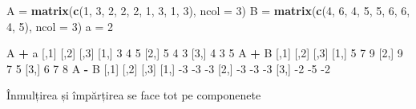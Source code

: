 \documentclass[]{article}
\newenvironment{Shaded}{\begin{snugshade}}{\end{snugshade}}
\newcommand{\DataTypeTok}[1]{\textcolor[rgb]{0.13,0.29,0.53}{#1}}
\newcommand{\DecValTok}[1]{\textcolor[rgb]{0.00,0.00,0.81}{#1}}
\newcommand{\KeywordTok}[1]{\textcolor[rgb]{0.13,0.29,0.53}{\textbf{#1}}}
\newcommand{\NormalTok}[1]{#1}
\newcommand{\OperatorTok}[1]{\textcolor[rgb]{0.81,0.36,0.00}{\textbf{#1}}}
\newcommand{\StringTok}[1]{\textcolor[rgb]{0.31,0.60,0.02}{#1}}
\begin{document}
\begin{Shaded}
\begin{Highlighting}[]
\NormalTok{A =}\StringTok{ }\KeywordTok{matrix}\NormalTok{(}\KeywordTok{c}\NormalTok{(}\DecValTok{1}\NormalTok{, }\DecValTok{3}\NormalTok{, }\DecValTok{2}\NormalTok{, }\DecValTok{2}\NormalTok{, }\DecValTok{2}\NormalTok{, }\DecValTok{1}\NormalTok{, }\DecValTok{3}\NormalTok{, }\DecValTok{1}\NormalTok{, }\DecValTok{3}\NormalTok{), }\DataTypeTok{ncol =} \DecValTok{3}\NormalTok{)}
\NormalTok{B =}\StringTok{ }\KeywordTok{matrix}\NormalTok{(}\KeywordTok{c}\NormalTok{(}\DecValTok{4}\NormalTok{, }\DecValTok{6}\NormalTok{, }\DecValTok{4}\NormalTok{, }\DecValTok{5}\NormalTok{, }\DecValTok{5}\NormalTok{, }\DecValTok{6}\NormalTok{, }\DecValTok{6}\NormalTok{, }\DecValTok{4}\NormalTok{, }\DecValTok{5}\NormalTok{), }\DataTypeTok{ncol =} \DecValTok{3}\NormalTok{)}
\NormalTok{a =}\StringTok{ }\DecValTok{2}

\NormalTok{A }\OperatorTok{+}\StringTok{ }\NormalTok{a}
\NormalTok{     [,}\DecValTok{1}\NormalTok{] [,}\DecValTok{2}\NormalTok{] [,}\DecValTok{3}\NormalTok{]}
\NormalTok{[}\DecValTok{1}\NormalTok{,]    }\DecValTok{3}    \DecValTok{4}    \DecValTok{5}
\NormalTok{[}\DecValTok{2}\NormalTok{,]    }\DecValTok{5}    \DecValTok{4}    \DecValTok{3}
\NormalTok{[}\DecValTok{3}\NormalTok{,]    }\DecValTok{4}    \DecValTok{3}    \DecValTok{5}
\NormalTok{A }\OperatorTok{+}\StringTok{ }\NormalTok{B}
\NormalTok{     [,}\DecValTok{1}\NormalTok{] [,}\DecValTok{2}\NormalTok{] [,}\DecValTok{3}\NormalTok{]}
\NormalTok{[}\DecValTok{1}\NormalTok{,]    }\DecValTok{5}    \DecValTok{7}    \DecValTok{9}
\NormalTok{[}\DecValTok{2}\NormalTok{,]    }\DecValTok{9}    \DecValTok{7}    \DecValTok{5}
\NormalTok{[}\DecValTok{3}\NormalTok{,]    }\DecValTok{6}    \DecValTok{7}    \DecValTok{8}
\NormalTok{A }\OperatorTok{-}\StringTok{ }\NormalTok{B}
\NormalTok{     [,}\DecValTok{1}\NormalTok{] [,}\DecValTok{2}\NormalTok{] [,}\DecValTok{3}\NormalTok{]}
\NormalTok{[}\DecValTok{1}\NormalTok{,]   }\DecValTok{-3}   \DecValTok{-3}   \DecValTok{-3}
\NormalTok{[}\DecValTok{2}\NormalTok{,]   }\DecValTok{-3}   \DecValTok{-3}   \DecValTok{-3}
\NormalTok{[}\DecValTok{3}\NormalTok{,]   }\DecValTok{-2}   \DecValTok{-5}   \DecValTok{-2}
\end{Highlighting}
\end{Shaded}

Înmulțirea și împărțirea se face tot pe componenete
\end{document}
